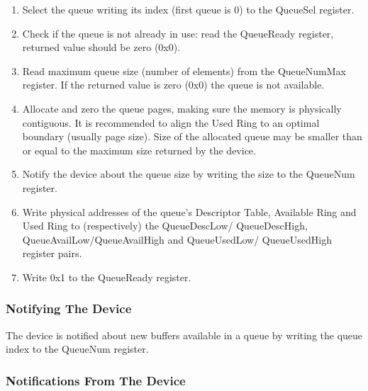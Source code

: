 \begin{enumerate}
\item Select the queue writing its index (first queue is 0) to the
   QueueSel register.

\item Check if the queue is not already in use: read the QueueReady
   register, returned value should be zero (0x0).

\item Read maximum queue size (number of elements) from the
   QueueNumMax register. If the returned value is zero (0x0) the
   queue is not available.

\item Allocate and zero the queue pages, making sure the memory
   is physically contiguous. It is recommended to align the
   Used Ring to an optimal boundary (usually page size).
   Size of the allocated queue may be smaller than or equal to
   the maximum size returned by the device.

\item Notify the device about the queue size by writing the size to
   the QueueNum register.

\item Write physical addresses of the queue's Descriptor Table,
   Available Ring and Used Ring to (respectively) the QueueDescLow/
   QueueDescHigh, QueueAvailLow/QueueAvailHigh and QueueUsedLow/
   QueueUsedHigh register pairs.

\item Write 0x1 to the QueueReady register.
\end{enumerate}

\subsubsection{Notifying The Device}\label{sec:Virtio Transport Options / Virtio Over MMIO / MMIO-specific Initialization And Device Operation / Notifying The Device}

The device is notified about new buffers available in a queue by
writing the queue index to the QueueNum register.

\subsubsection{Notifications From The Device}\label{sec:Virtio Transport Options / Virtio Over MMIO / MMIO-specific Initialization And Device Operation / Notifications From The Device}

